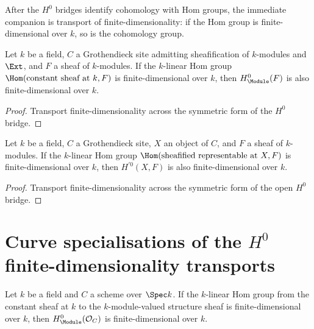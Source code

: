 After the \(H^0\) bridges identify cohomology with Hom groups, the immediate companion is transport of finite-dimensionality: if the Hom group is finite-dimensional over \(k\), so is the cohomology group.

\begin{theorem}\leanok
  \label{thm:Scheme_module_finite_HModule_zero}

  Let \(k\) be a field, \(C\) a Grothendieck site admitting sheafification of \(k\)-modules and \(\Ext\), and \(F\) a sheaf of \(k\)-modules. If the \(k\)-linear Hom group \(\Hom(\text{constant sheaf at }k, F)\) is finite-dimensional over \(k\), then \(H^0_{\Module}(F)\) is also finite-dimensional over \(k\).
\end{theorem}

\begin{proof}

  \leanok
  Transport finite-dimensionality across the symmetric form of the \(H^0\) bridge.
\end{proof}

\begin{theorem}\leanok
  \label{thm:Scheme_module_finite_HModule_prime_zero}
  Let \(k\) be a field, \(C\) a Grothendieck site, \(X\) an object of \(C\), and \(F\) a sheaf of \(k\)-modules. If the \(k\)-linear Hom group \(\Hom(\text{sheafified representable at }X, F)\) is finite-dimensional over \(k\), then \(H^{\prime 0}(X, F)\) is also finite-dimensional over \(k\).
\end{theorem}

\begin{proof}

  \leanok
  Transport finite-dimensionality across the symmetric form of the open \(H^0\) bridge.
\end{proof}

\section{Curve specialisations of the \(H^0\) finite-dimensionality transports}
\label{sec:HModule_finite_zero_curve_iter039}

\begin{theorem}\leanok
  \label{thm:Scheme_module_finite_HModule_zero_curve}
  Let \(k\) be a field and \(C\) a scheme over \(\Spec k\). If the \(k\)-linear Hom group from the constant sheaf at \(k\) to the \(k\)-module-valued structure sheaf is finite-dimensional over \(k\), then \(H^0_{\Module}(\mathcal O_C)\) is finite-dimensional over \(k\).
\end{theorem}


